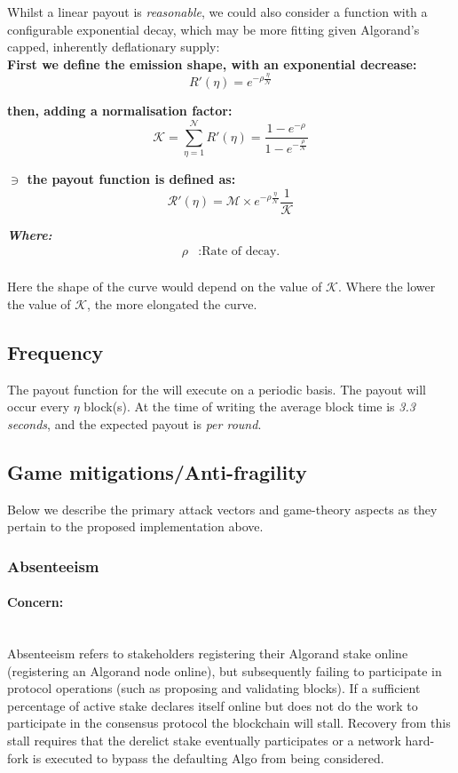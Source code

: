 \documentclass[11pt,a4paper]{article}
\begin{document}
Whilst a linear payout is \textit{reasonable}, we could also consider a function with a configurable exponential decay, which may 
be more fitting given Algorand's capped, inherently deflationary supply: \\ 

\textbf{First we define the emission shape, with an exponential decrease:}
\[
R'(\eta)= e^{-\rho\frac{\eta}{\mathcal{N}}}
\]

\textbf{then, adding a normalisation factor:}
\[
\mathcal{K} = \sum_{\eta=1}^\mathcal{N}R'(\eta)= \frac{1-e^{-\rho}}{1-e^{-\frac{\rho}{\mathcal{N}}}}
\]

\textbf{$\ni$ the payout function is defined as:}
\[
\mathcal{R'}(\eta)= \mathcal{M}\times e^{-\rho\frac{\eta}{\mathcal{N}}} \frac{1}{\mathcal{K}}
\]

\textbf{\emph{Where:}}
\begin{align*}
\rho & : \text{Rate of decay.} \\
\end{align*}


Here the shape of the curve would depend on the value of \(\mathcal{K}\). Where the lower the value of \(\mathcal{K}\), 
the more elongated the curve.

\subsection{Frequency}
The payout function for the  will execute on a periodic basis. The payout will occur every 
$\eta$ block(s). At the time of writing the average block time is \emph{3.3 seconds}, and the expected payout is 
\textit{per round}.

\subsection{Game mitigations/Anti-fragility}
Below we describe the primary attack vectors and game-theory aspects as they pertain to the proposed implementation 
above.

\subsubsection{Absenteeism} \label{subsubsec:absenteeism}

\paragraph{Concern:} \mbox{}\\
Absenteeism refers to stakeholders registering their Algorand stake online (registering an Algorand node online), but 
subsequently failing to participate in protocol operations (such as proposing and validating blocks). If a sufficient 
percentage of active stake declares itself online but does not do the work to participate in the consensus protocol the 
blockchain will stall. Recovery from this stall requires that the derelict stake eventually participates or a network 
hard-fork is executed to bypass the defaulting Algo from being considered. 
\end{document}
